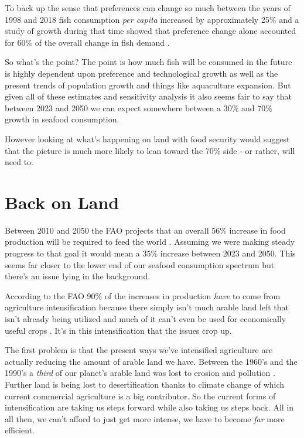 \documentclass[11pt,a5paper]{book}
\begin{document}
To back up the sense that preferences can change so much between the years of 1998 and 2018 fish consumption \textit{per capita} increased by approximately 25\% and a study of growth during that time showed that preference change alone accounted for 60\% of the overall change in fish demand \cite{bfafish}. 
\newline

So what's the point? The point is how much fish will be consumed in the future is highly dependent upon preference and technological growth as well as the present trends of population growth and things like aquaculture expansion. But given all of these estimates and sensitivity analysis it also seems fair to say that between 2023 and 2050 we can expect somewhere between a 30\% and 70\% growth in seafood consumption. 
\newline

However looking at what's happening on land with food security would suggest that the picture is much more likely to lean toward the 70\% side - or rather, will need to.

\section{Back on Land}

Between 2010 and 2050 the FAO projects that an overall 56\% increase in food production will be required to feed the world \cite{nymore}. Assuming we were making steady progress to that goal it would mean a 35\% increase between 2023 and 2050. This seems far closer to the lower end of our seafood consumption spectrum but there's an issue lying in the background. 
\newline 

According to the FAO 90\% of the increases in production \textit{have} to come from agriculture intensification because there simply isn't much arable land left that isn't already being utilized and much of it can't even be used for economically useful crops \cite{faosecurity}. It's in this intensification that the issues crop up.
\newline

The first problem is that the present ways we've intensified agriculture are actually reducing the amount of arable land we have. Between the 1960's and the 1990's a \textit{third} of our planet's arable land was lost to erosion and pollution \cite{lostarable}. Further land is being lost to desertification thanks to climate change of which current commercial agriculture is a big contributor. So the current forms of intensification are taking us steps forward while also taking us steps back. All in all then, we can't afford to just get more intense, we have to become \textit{far} more efficient. 
\newline
\end{document}
